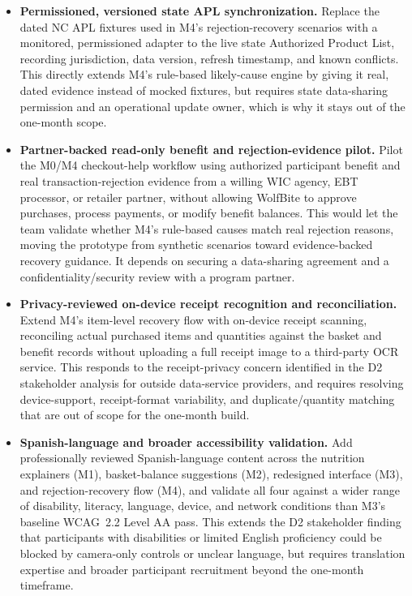 \documentclass[sigconf]{acmart}
\begin{document}
\begin{itemize}
  \item \textbf{Permissioned, versioned state APL synchronization.}
  Replace the dated NC APL fixtures used in M4's rejection-recovery scenarios
  with a monitored, permissioned adapter to the live state Authorized Product
  List, recording jurisdiction, data version, refresh timestamp, and known
  conflicts. This directly extends M4's rule-based likely-cause engine by
  giving it real, dated evidence instead of mocked fixtures, but requires
  state data-sharing permission and an operational update owner, which is
  why it stays out of the one-month scope.

  \item \textbf{Partner-backed read-only benefit and rejection-evidence
  pilot.}
  Pilot the M0/M4 checkout-help workflow using authorized participant benefit
  and real transaction-rejection evidence from a willing WIC agency, EBT
  processor, or retailer partner, without allowing WolfBite to approve
  purchases, process payments, or modify benefit balances. This would let the
  team validate whether M4's rule-based causes match real rejection reasons,
  moving the prototype from synthetic scenarios toward evidence-backed
  recovery guidance. It depends on securing a data-sharing agreement and a
  confidentiality/security review with a program partner.

  \item \textbf{Privacy-reviewed on-device receipt recognition and
  reconciliation.}
  Extend M4's item-level recovery flow with on-device receipt scanning,
  reconciling actual purchased items and quantities against the basket and
  benefit records without uploading a full receipt image to a third-party OCR
  service. This responds to the receipt-privacy concern identified in the D2
  stakeholder analysis for outside data-service providers, and requires
  resolving device-support, receipt-format variability, and duplicate/quantity
  matching that are out of scope for the one-month build.

  \item \textbf{Spanish-language and broader accessibility validation.}
  Add professionally reviewed Spanish-language content across the nutrition
  explainers (M1), basket-balance suggestions (M2), redesigned interface (M3),
  and rejection-recovery flow (M4), and validate all four against a wider
  range of disability, literacy, language, device, and network conditions than
  M3's baseline WCAG~2.2 Level AA pass. This extends the D2 stakeholder
  finding that participants with disabilities or limited English proficiency
  could be blocked by camera-only controls or unclear language, but requires
  translation expertise and broader participant recruitment beyond the
  one-month timeframe.


\end{itemize}
\end{document}
